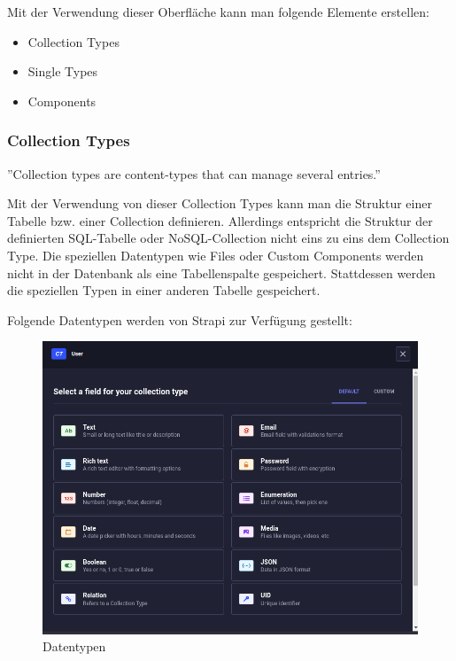 Mit der Verwendung dieser Oberfläche kann man folgende Elemente erstellen:
\begin{itemize}
  \item Collection Types
  \item Single Types
  \item Components
\end{itemize}

\subsubsection{Collection Types}

''Collection types are content-types that can manage several entries.''
\cite{collection-types}

Mit der Verwendung von dieser Collection Types kann man die Struktur einer Tabelle bzw. einer Collection definieren.
Allerdings entspricht die Struktur der definierten SQL-Tabelle oder NoSQL-Collection nicht eins zu eins dem Collection Type.
Die speziellen Datentypen wie Files oder Custom Components werden nicht in der Datenbank als eine Tabellenspalte gespeichert.
Stattdessen werden die speziellen Typen in einer anderen Tabelle gespeichert.

Folgende Datentypen  werden von Strapi zur Verfügung gestellt:

\begin{figure}[H]
  \centering
  \includegraphics[width=\textwidth]{./pics/datatypes}
  \caption{Datentypen}
  \label{datatypes}
\end{figure}

